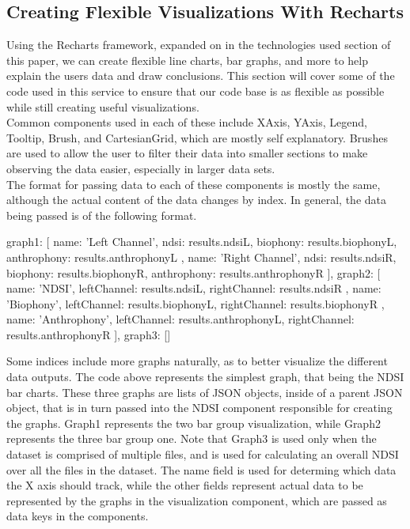 \subsection{Creating Flexible Visualizations With Recharts}
Using the Recharts framework, expanded on in the technologies used section of this paper, we can create flexible line charts, bar graphs, and more to help explain the user\textquotesingle s data and draw conclusions. This section will cover some of the code used in this service to ensure that our code base is as flexible as possible while still creating useful visualizations.\\

\noindent Common components used in each of these include XAxis, YAxis, Legend, Tooltip, Brush, and CartesianGrid, which are mostly self explanatory. Brushes are used to allow the user to filter their data into smaller sections to make observing the data easier, especially in larger data sets.\\

\noindent The format for passing data to each of these components is mostly the same, although the actual content of the data changes by index. In general, the data being passed is of the following format.

\begin{javascriptcode}
{
  graph1: [
            {
              name: 'Left Channel',
              ndsi: results.ndsiL,
              biophony: results.biophonyL,
              anthrophony: results.anthrophonyL
            },
            {
              name: 'Right Channel',
              ndsi: results.ndsiR,
              biophony: results.biophonyR,
              anthrophony: results.anthrophonyR
            }
          ],
  graph2: [
            {
              name: 'NDSI',
              leftChannel: results.ndsiL,
              rightChannel: results.ndsiR
            },
            {
              name: 'Biophony',
              leftChannel: results.biophonyL,
              rightChannel: results.biophonyR
            },
            {
              name: 'Anthrophony',
              leftChannel: results.anthrophonyL,
              rightChannel: results.anthrophonyR
            }
          ],
  graph3: []
}
\end{javascriptcode}

\noindent Some indices include more graphs naturally, as to better visualize the different data outputs. The code above represents the simplest graph, that being the NDSI bar charts. These three graphs are lists of JSON objects, inside of a parent JSON object, that is in turn passed into the NDSI component responsible for creating the graphs. Graph1 represents the two bar group visualization, while Graph2 represents the three bar group one. Note that Graph3 is used only when the dataset is comprised of multiple files, and is used for calculating an overall NDSI over all the files in the dataset. The name field is used for determing which data the X axis should track, while the other fields represent actual data to be represented by the graphs in the visualization component, which are passed as data keys in the components.





